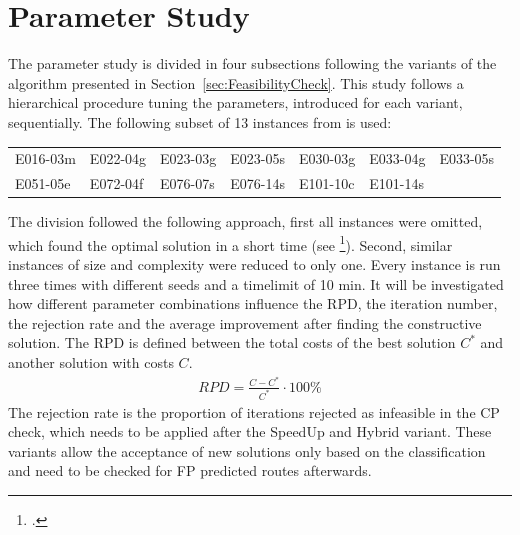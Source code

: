 \section{Parameter Study}
\label{sec:parameter_study}

The parameter study is divided in four subsections following the variants of the algorithm
presented in Section~\ref{sec:FeasibilityCheck}. This study follows a hierarchical procedure
tuning the parameters, introduced for each variant, sequentially. The following subset of 13
instances from \gendreauDataSetText is used:


\begin{table}[ht]
    \centering
    \setlength{\tabcolsep}{0.75em}
    \def\arraystretch{1.5}
    \begin{tabular}{lllllll}
        E016-03m & E022-04g & E023-03g & E023-05s & E030-03g & E033-04g & E033-05s \\
        E051-05e & E072-04f & E076-07s & E076-14s & E101-10c & E101-14s &          \\
    \end{tabular}
\end{table}

The division followed the following approach, first all instances were omitted, which found
the optimal solution in a short time (see \cite{tamke_branch-and-cut_2024}\footcite[cf.][p.26]{tamke_branch-and-cut_2024}).
Second, similar instances of size and complexity were reduced to only one.
Every instance is run three times with different seeds and a timelimit of 10 min. It will be investigated
how different parameter combinations influence the \gls{RPD}, the iteration number, the rejection rate and
the average improvement after finding the constructive solution. The \gls{RPD} is defined between the
total costs of the best solution $C^*$ and another solution with costs $C$.
\begin{align}
    RPD = \frac{C - C^*}{C^*} \cdot 100\%
\end{align}
The rejection rate is the proportion of iterations rejected as infeasible in the \gls{CP} check, which needs
to be applied after the SpeedUp and Hybrid  variant. These variants allow the acceptance of
new solutions only based on the classification and need to be checked for \gls{FP} predicted routes afterwards.

